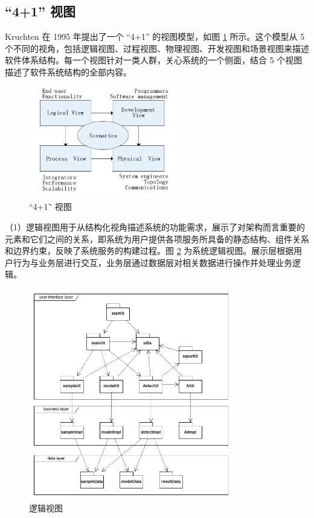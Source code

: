 \documentclass[
  ]{njuthesis}
\begin{document}
\subsection{“4+1” 视图}

Kruchten 在 1995 年提出了一个 “4+1” 的视图模型，如图 \ref{4+1视图} 所示。这个模型从 5 个不同的视角，包括逻辑视图、过程视图、物理视图、开发视图和场景视图来描述软件体系结构。每一个视图针对一类人群，关心系统的一个侧面，结合 5 个视图描述了软件系统结构的全部内容\cite{[11]}。

\begin{figure}[htb]
    \centering
    \includegraphics[width=0.6\textwidth]{images/4+1视图.png}
    \caption{“4+1” 视图}
    \label{4+1视图}
\end{figure}

（1）逻辑视图用于从结构化视角描述系统的功能需求，展示了对架构而言重要的元素和它们之间的关系，即系统为用户提供各项服务所具备的静态结构、组件关系和边界约束，反映了系统服务的构建过程。图 \ref{逻辑视图} 为系统逻辑视图。展示层根据用户行为与业务层进行交互，业务层通过数据层对相关数据进行操作并处理业务逻辑。

\begin{figure}[H]
    \centering
    \includegraphics[width=0.8\textwidth]{images/逻辑视图.png}
    \caption{逻辑视图}
    \label{逻辑视图}
\end{figure}
\end{document}
